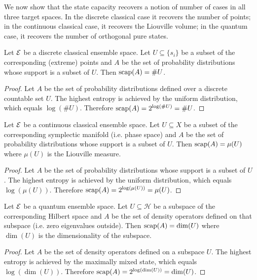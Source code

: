 We now show that the state capacity recovers a notion of number of cases in all three target spaces. In the discrete classical case it recovers the number of points; in the continuous classical case, it recovers the Liouville volume; in the quantum case, it recovers the number of orthogonal pure states.

\begin{mathSection}
\begin{prop}
	Let $\mathcal{E}$ be a discrete classical ensemble space. Let $U \subseteq \{s_i\}$ be a subset of the corresponding (extreme) points and $A$ be the set of probability distributions whose support is a subset of $U$. Then $\mathrm{scap}(A) = \#U$.
\end{prop}

\begin{proof}
	Let $A$ be the set of probability distributions defined over a discrete countable set $U$. The highest entropy is achieved by the uniform distribution, which equals $\log (\#U)$. Therefore $\mathrm{scap}(A) = 2^{\log(\#U)} = \#U$.
\end{proof}

\begin{prop}
	Let $\mathcal{E}$ be a continuous classical ensemble space. Let $U \subseteq X$ be a subset of the corresponding symplectic manifold (i.e. phase space) and $A$ be the set of probability distributions whose support is a subset of $U$. Then $\mathrm{scap}(A) = \mu(U)$ where $\mu(U)$ is the Liouville measure.
\end{prop}

\begin{proof}
	Let $A$ be the set of probability distributions whose support is a subset of $U$. The highest entropy is achieved by the uniform distribution, which equals $\log(\mu(U))$. Therefore $\mathrm{scap}(A) = 2^{\log(\mu(U))} = \mu(U)$.
\end{proof}

\begin{prop}
	Let $\mathcal{E}$ be a quantum ensemble space. Let $U \subseteq \mathcal{H}$ be a subspace of the corresponding Hilbert space and $A$ be the set of density operators defined on that subspace (i.e. zero eigenvalues outside). Then $\mathrm{scap}(A) = \dim(U)$ where $\dim(U)$ is the dimensionality of the subspace.
\end{prop}

\begin{proof}
	Let $A$ be the set of density operators defined on a subspace $U$. The highest entropy is achieved by the maximally mixed state, which equals $\log(\dim(U))$. Therefore $\mathrm{scap}(A) = 2^{\log(\dim(U))} = \dim(U)$.
\end{proof}
\end{mathSection}

